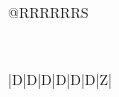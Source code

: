 \pagestyle{empty}
\begin{center}
  
\end{center}
\newpage
\begin{center}
  
\end{center}
\begin{tabularx}{\textwidth}{@{}RRRRRRS}
  
\end{tabularx}
\\
\begin{tabularx}{\textwidth}{|D|D|D|D|D|D|Z|}
  \hline
  
\end{tabularx}
